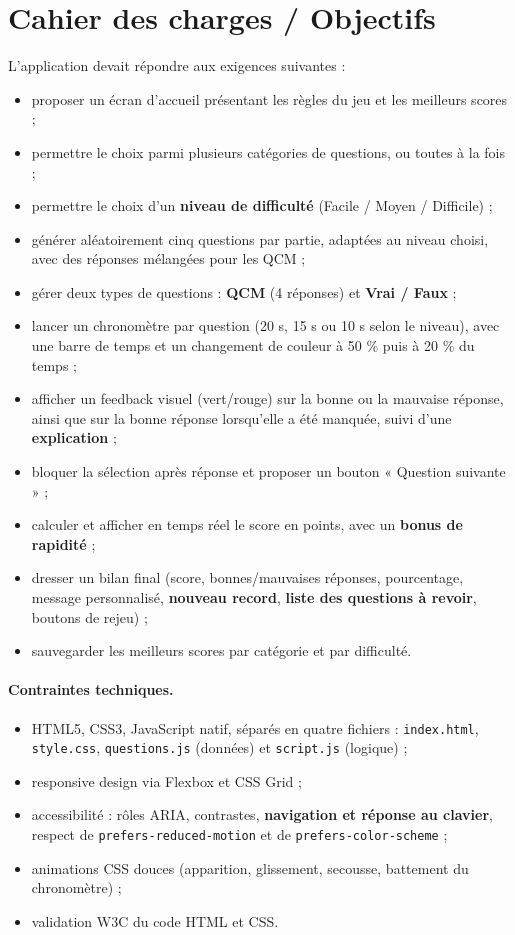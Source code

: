 \documentclass[11pt,a4paper]{article}
\begin{document}
\section{Cahier des charges / Objectifs}
L'application devait répondre aux exigences suivantes :
\begin{itemize}
  \item proposer un écran d'accueil présentant les règles du jeu et les meilleurs scores ;
  \item permettre le choix parmi plusieurs catégories de questions, ou toutes à la fois ;
  \item permettre le choix d'un \textbf{niveau de difficulté} (Facile / Moyen / Difficile) ;
  \item générer aléatoirement cinq questions par partie, adaptées au niveau choisi, avec
        des réponses mélangées pour les QCM ;
  \item gérer deux types de questions : \textbf{QCM} (4 réponses) et \textbf{Vrai / Faux} ;
  \item lancer un chronomètre par question (20 s, 15 s ou 10 s selon le niveau), avec une
        barre de temps et un changement de couleur à 50 \% puis à 20 \% du temps ;
  \item afficher un feedback visuel (vert/rouge) sur la bonne ou la mauvaise réponse, ainsi
        que sur la bonne réponse lorsqu'elle a été manquée, suivi d'une \textbf{explication} ;
  \item bloquer la sélection après réponse et proposer un bouton « Question suivante » ;
  \item calculer et afficher en temps réel le score en points, avec un \textbf{bonus de
        rapidité} ;
  \item dresser un bilan final (score, bonnes/mauvaises réponses, pourcentage, message
        personnalisé, \textbf{nouveau record}, \textbf{liste des questions à revoir},
        boutons de rejeu) ;
  \item sauvegarder les meilleurs scores par catégorie et par difficulté.
\end{itemize}

\paragraph{Contraintes techniques.}
\begin{itemize}
  \item HTML5, CSS3, JavaScript natif, séparés en quatre fichiers : \texttt{index.html},
        \texttt{style.css}, \texttt{questions.js} (données) et \texttt{script.js} (logique) ;
  \item responsive design via Flexbox et CSS Grid ;
  \item accessibilité : rôles ARIA, contrastes, \textbf{navigation et réponse au clavier},
        respect de \texttt{prefers-reduced-motion} et de \texttt{prefers-color-scheme} ;
  \item animations CSS douces (apparition, glissement, secousse, battement du chronomètre) ;
  \item validation W3C du code HTML et CSS.
\end{itemize}
\end{document}
